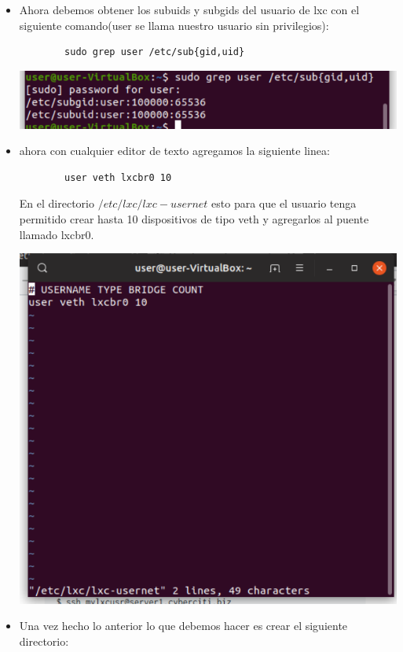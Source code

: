 \documentclass[a4paper, 11pt, oneside]{article}
\begin{document}
\begin{itemize}
\begin{itemize}
\begin{center}
    \end{center}
    \item Ahora debemos obtener los subuids y subgids del usuario de lxc con el siguiente comando(user se llama nuestro usuario sin privilegios):
    \begin{verbatim}
        sudo grep user /etc/sub{gid,uid}
    \end{verbatim}
    \begin{center}
        \includegraphics[scale=0.45]{P93.png}
    \end{center}
    \item ahora con cualquier editor de texto agregamos la siguiente linea:
    \begin{verbatim}
        user veth lxcbr0 10
    \end{verbatim}
    En el directorio $/etc/lxc/lxc-usernet$ esto para que el usuario tenga permitido crear hasta 10 dispositivos de tipo veth y agregarlos al puente llamado lxcbr0.
    \begin{center}
        \includegraphics[scale=0.45]{P94.png}
    \end{center}
    \item Una vez hecho lo anterior lo que debemos hacer es crear el siguiente directorio:

\end{itemize}
\end{itemize}
\end{document}
